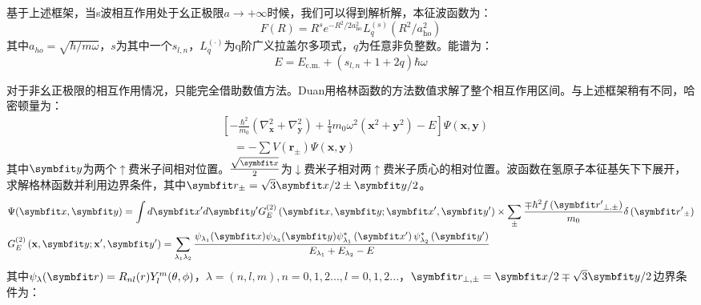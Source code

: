 基于上述框架，当s波相互作用处于幺正极限$a\to+\infty$时候，我们可以得到解析解，本征波函数为：
\begin{equation}
 F(R)=R^{s} e^{-R^{2} / 2 a_{\mathrm{ho}}^{2}} L_{q}^{(s)}\left(R^{2} / a_{\mathrm{ho}}^{2}\right)
\end{equation}
其中$a_{ho}=\sqrt{\hbar/m\omega}$，$s$为其中一个$s_{l,n}$，$L^{(\cdot)}_q$为q阶广义拉盖尔多项式，$q$为任意非负整数。能谱为：
\begin{equation}
E=E_{\mathrm{c} . \mathrm{m} .}+\left(s_{l, n}+1+2 q\right) \hbar \omega
\end{equation}

对于非幺正极限的相互作用情况，只能完全借助数值方法。Duan\cite{LmDuan2007levelcrossing}用格林函数的方法数值求解了整个相互作用区间。与上述框架稍有不同，哈密顿量为：
\begin{equation}
\begin{aligned}
&{\left[-\frac{\hbar^{2}}{m_{0}}\left(\nabla_{\mathbf{x}}^{2}+\nabla_{\mathbf{y}}^{2}\right)+\frac{1}{4} m_{0} \omega^{2}\left(\mathbf{x}^{2}+\mathbf{y}^{2}\right)-E\right] \Psi(\mathbf{x}, \mathbf{y})} \\
&\quad=-\sum V\left(\mathbf{r}_{\pm}\right) \Psi(\mathbf{x}, \mathbf{y})
\end{aligned}
\end{equation}
其中$\Vector{y}$为两个$\uparrow$费米子间相对位置。$\frac{\sqrt{\Vector{x}}}{2}$为$\downarrow$费米子相对两$\uparrow$费米子质心的相对位置。波函数在氢原子本征基矢下下展开，求解格林函数并利用边界条件，其中$\Vector{r}_{\pm}=\sqrt{3} \Vector{x} / 2 \pm \Vector{y} / 2$。
\begin{equation}
\begin{aligned}
&\Psi(\Vector{x}, \Vector{y})= \int d \Vector{x}^{\prime} d \Vector{y}^{\prime} G_{E}^{(2)}\left(\Vector{x}, \Vector{y} ; \Vector{x}^{\prime}, \Vector{y}^{\prime}\right)\times \sum_{\pm} \frac{\mp \hbar^{2} f\left(\Vector{r}^{\prime}{ }_{\perp, \pm}\right)}{m_{0}} \delta\left(\Vector{r}^{\prime}{ }_{\pm}\right)\\
&G_{E}^{(2)}\left(\mathbf{x}, \Vector{y} ; \mathbf{x}^{\prime}, \Vector{y}^{\prime}\right)=\sum_{\lambda_{1} \lambda_{2}} \frac{\psi_{\lambda_{1}}(\Vector{x}) \psi_{\lambda_{2}}(\Vector{y}) \psi_{\lambda_{1}}^{*}\left(\Vector{x}^{\prime}\right) \psi_{\lambda_{2}}^{*}\left(\Vector{y}^{\prime}\right)}{E_{\lambda_{1}}+E_{\lambda_{2}}-E}\\
\end{aligned}
\end{equation}
其中$\psi_\lambda(\Vector{r}) = R_{nl}(r)Y_l^m(\theta,\phi)$，$\lambda = (n,l,m),n=0,1,2...,l=0,1,2...$，$\Vector{r}_{\perp, \pm}=\Vector{x} / 2 \mp \sqrt{3} \Vector{y} / 2$边界条件为：
